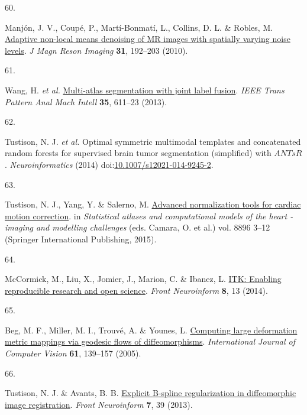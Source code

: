 \documentclass[
  12pt,
]{article}
\newlength{\cslhangindent}
\newlength{\csllabelwidth}
\newenvironment{CSLReferences}[2] %
 {\begin{list}{}{%
  \setlength{\itemindent}{0pt}
  \setlength{\leftmargin}{0pt}
  \setlength{\parsep}{0pt}
  \ifodd #1
   \setlength{\leftmargin}{\cslhangindent}
   \setlength{\itemindent}{-1\cslhangindent}
  \fi
  \setlength{\itemsep}{#2\baselineskip}}}
 {\end{list}}
\newcommand{\CSLLeftMargin}[1]{\parbox[t]{\csllabelwidth}{\strut#1\strut}}
\newcommand{\CSLRightInline}[1]{\parbox[t]{\linewidth - \csllabelwidth}{\strut#1\strut}}
\begin{document}
\begin{CSLReferences}{0}{0}
\CSLLeftMargin{60. }%
\CSLRightInline{Manjón, J. V., Coupé, P., Martí-Bonmatí, L., Collins, D.
L. \& Robles, M. \href{https://doi.org/10.1002/jmri.22003}{Adaptive
non-local means denoising of {MR} images with spatially varying noise
levels}. \emph{J Magn Reson Imaging} \textbf{31}, 192--203 (2010).}

\CSLLeftMargin{61. }%
\CSLRightInline{Wang, H. \emph{et al.}
\href{https://doi.org/10.1109/TPAMI.2012.143}{Multi-atlas segmentation
with joint label fusion}. \emph{IEEE Trans Pattern Anal Mach Intell}
\textbf{35}, 611--23 (2013).}

\CSLLeftMargin{62. }%
\CSLRightInline{Tustison, N. J. \emph{et al.} Optimal symmetric
multimodal templates and concatenated random forests for supervised
brain tumor segmentation (simplified) with {\(ANTsR\)}.
\emph{Neuroinformatics} (2014)
doi:\href{https://doi.org/10.1007/s12021-014-9245-2}{10.1007/s12021-014-9245-2}.}

\CSLLeftMargin{63. }%
\CSLRightInline{Tustison, N. J., Yang, Y. \& Salerno, M.
\href{https://doi.org/10.1007/978-3-319-14678-2_1}{Advanced
normalization tools for cardiac motion correction}. in \emph{Statistical
atlases and computational models of the heart - imaging and modelling
challenges} (eds. Camara, O. et al.) vol. 8896 3--12 (Springer
International Publishing, 2015).}

\CSLLeftMargin{64. }%
\CSLRightInline{McCormick, M., Liu, X., Jomier, J., Marion, C. \&
Ibanez, L. \href{https://doi.org/10.3389/fninf.2014.00013}{ITK: Enabling
reproducible research and open science}. \emph{Front Neuroinform}
\textbf{8}, 13 (2014).}

\CSLLeftMargin{65. }%
\CSLRightInline{Beg, M. F., Miller, M. I., Trouvé, A. \& Younes, L.
\href{https://doi.org/10.1023/B:VISI.0000043755.93987.aa}{Computing
large deformation metric mappings via geodesic flows of
diffeomorphisms}. \emph{International Journal of Computer Vision}
\textbf{61}, 139--157 (2005).}

\CSLLeftMargin{66. }%
\CSLRightInline{Tustison, N. J. \& Avants, B. B.
\href{https://doi.org/10.3389/fninf.2013.00039}{Explicit {B}-spline
regularization in diffeomorphic image registration}. \emph{Front
Neuroinform} \textbf{7}, 39 (2013).}


\end{CSLReferences}
\end{document}
